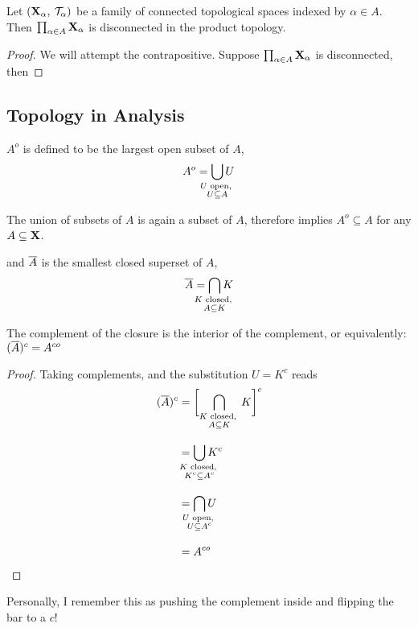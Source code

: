 \documentclass[../../main.tex]{subfiles}
\begin{document}
\begin{wts}
    Let $({\mathbf{X}}_\alpha,\: \mathcal{T}_{\alpha})$ be a family of connected topological spaces indexed by $\alpha\in A$. Then $\prod_{\alpha\in A}{\mathbf{X}}_\alpha$ is disconnected in the product topology.
\end{wts}
\begin{proof}
    We will attempt the contrapositive. Suppose $\prod_{\alpha\in A}{\mathbf{X}}_\alpha$ is disconnected, then
\end{proof}



\newpage
\subsection*{Topology in Analysis}
\begin{definition}\label{chp4:interior-definition}
    $A^o$ is defined to be the largest open subset of $A$, 
    \[
        A^o = \bigcup_{\mathclap{\substack{\text{$U$ open, }\\ U\subseteq A}}} U
    \]
\end{definition}
\begin{corollary}\label{chp4:interior-subset}
    The union of subsets of $A$ is again a subset of $A$, therefore  implies $A^o\subseteq A$ for any $A\subseteq {\mathbf{X}}$. 
\end{corollary}


\begin{definition}\label{chp4:closure-definition}
    and $\overline{A}$ is the smallest closed superset of $A$,
    \[
        \cl{A} = \bigcap_{\mathclap{\substack{\text{$K$ closed, }\\ A\subseteq K}}} K
    \]
\end{definition}


\begin{wts}\label{chp4:flipping-interior-to-closure}
    The complement of the closure is the interior of the complement, or equivalently: $(\overline{A})^c = A^{co}$
\end{wts}
\begin{proof}
    Taking complements, and the substitution $U = K^c$ reads
    \begin{align*}
        (\cl{A})^c &= \biggl[\bigcap_{{\substack{\text{$K$ closed, }\\ A\subseteq K}}} K \biggr]^c\\[2ex]
        &= \bigcup_{\mathclap{\substack{\text{$K$ closed, }\\ K^c\subseteq A^c}}} K^c\\[2ex]
        &= \bigcap_{\mathclap{\substack{\text{$U$ open, }\\ U\subseteq A^c}}} U\\[2ex]
        &= A^{co}
    \end{align*}
\end{proof}
\begin{remark}
    Personally, I remember this as pushing the complement inside and flipping the bar to a $c$!
\end{remark}
\end{document}
